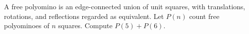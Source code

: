 A free polyomino is an edge-connected union of unit squares, with translations, rotations, and reflections regarded as equivalent. Let $P(n)$ count free polyominoes of $n$ squares. Compute $P(5)+P(6)$.
